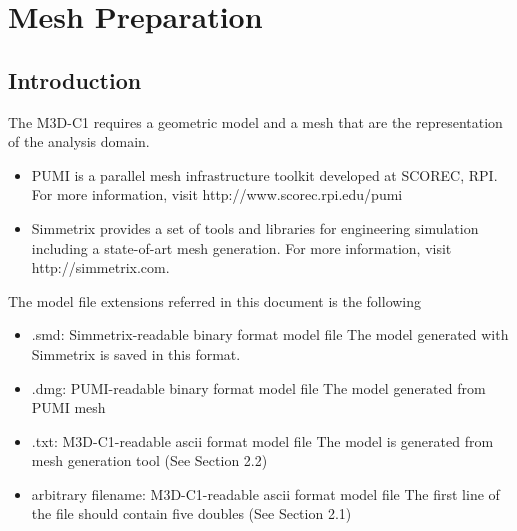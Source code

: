 \section{Mesh Preparation}
\subsection{Introduction}

The M3D-C1 requires a geometric model and a mesh that are the representation of the analysis domain. 
\begin{itemize}
\item PUMI is a parallel mesh infrastructure toolkit developed at SCOREC, RPI. For more information, visit http://www.scorec.rpi.edu/pumi
\item	Simmetrix provides a set of tools and libraries for engineering simulation including a state-of-art mesh generation. For more information, visit http://simmetrix.com.
\end{itemize}

The model file extensions referred in this document is the following
\begin{itemize}
\item .smd: Simmetrix-readable binary format model file  
\newline  The model generated with Simmetrix is saved in this format.
\item .dmg: PUMI-readable binary format model file
\newline	The model generated from PUMI mesh
\item	.txt: M3D-C1-readable ascii format model file 
\newline	The model is generated from mesh generation tool (See Section 2.2)
\item	arbitrary filename: M3D-C1-readable ascii format model file 
\newline  The first line of the file should contain five doubles (See Section 2.1)
\end{itemize}

